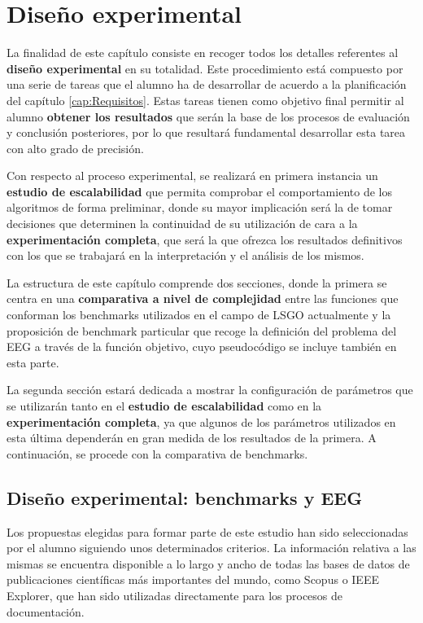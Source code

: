\chapter{Diseño experimental}\label{cap:DisenioExp}

La finalidad de este capítulo consiste en recoger todos los detalles referentes al \textbf{diseño experimental} en su totalidad. Este procedimiento está compuesto por una serie de tareas que el alumno ha de desarrollar de acuerdo a la planificación del capítulo \ref{cap:Requisitos}. Estas tareas tienen como objetivo final permitir al alumno \textbf{obtener los resultados} que serán la base de los procesos de evaluación y conclusión posteriores, por lo que resultará fundamental desarrollar esta tarea con alto grado de precisión.

Con respecto al proceso experimental, se realizará en primera instancia un \textbf{estudio de escalabilidad} que permita comprobar el comportamiento de los algoritmos de forma preliminar, donde su mayor implicación será la de tomar decisiones que determinen la continuidad de su utilización de cara a la \textbf{experimentación completa}, que será la que ofrezca los resultados definitivos con los que se trabajará en la interpretación y el análisis de los mismos.

La estructura de este capítulo comprende dos secciones, donde la primera se centra en una \textbf{comparativa a nivel de complejidad} entre las funciones que conforman los benchmarks utilizados en el campo de LSGO actualmente y la proposición de benchmark particular que recoge la definición del problema del EEG a través de la función objetivo, cuyo pseudocódigo se incluye también en esta parte. 

La segunda sección estará dedicada a mostrar la configuración de parámetros que se utilizarán tanto en el \textbf{estudio de escalabilidad} como en la \textbf{experimentación completa}, ya que algunos de los parámetros utilizados en esta última dependerán en gran medida de los resultados de la primera. A continuación, se procede con la comparativa de benchmarks.
 
\section{Diseño experimental: benchmarks y EEG}

Los propuestas elegidas para formar parte de este estudio han sido seleccionadas por el alumno siguiendo unos determinados criterios. La información relativa a las mismas se encuentra disponible a lo largo y ancho de todas las bases de datos de publicaciones científicas más importantes del mundo, como Scopus\cite{SCOPUS} o IEEE Explorer\cite{IEEECEC}, que han sido utilizadas directamente para los procesos de documentación.

